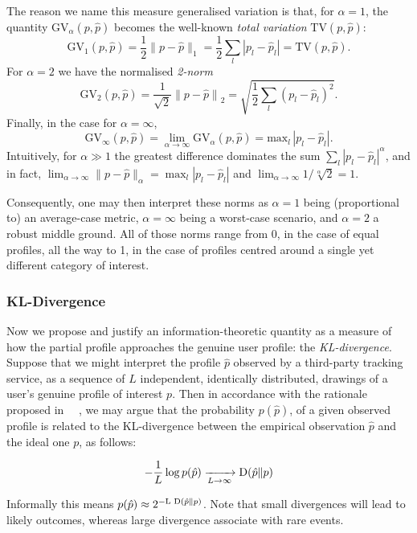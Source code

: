 The reason we name this measure generalised variation is that, for $\alpha = 1$, the quantity $\mathrm{GV}_\alpha(p, \hat{p})$ becomes the well-known \emph{total variation} $\mathrm{TV}(p, \hat{p}) $:
$$ \mathrm{GV}_1(p,\hat{p})= \frac {1} {2}  \| p - \hat{p} \|_1 =  \frac {1} {2} \sum_l | p_{l} - \hat{p}_{l} |=\mathrm{TV}(p, \hat{p}).$$
For $\alpha = 2$ we have the normalised \emph{2-norm}
$$ \mathrm{GV}_2(p,\hat{p}) = \frac {1} {\sqrt{2}}  {\| p - \hat{p} \|}_2 =  \sqrt{{\frac {1} {2}} { \sum_l{ (p_{l} - \hat{p}_{l})^2 } }}.$$
Finally, in the case for $\alpha = \infty$, 
$$\mathrm{GV}_\infty(p,\hat{p})=\lim_{\alpha\to\infty} \mathrm{GV}_\alpha(p, \hat{p}) = \mathrm{max}_l\,|p_l-\hat{p}_l|.$$
Intuitively, for $\alpha \gg 1$ the greatest difference dominates the sum $\sum_l{ {| p_l - \hat{p}_l |}^\alpha }$, and in fact, $\lim_{\alpha\to\infty} \| p - \hat{p} \|_\alpha = \max_l { | p_l - \hat{p}_l | } $ and $\lim_{\alpha\to\infty} 1/\sqrt[\alpha]{2}=1$.

Consequently, one may then interpret these norms as $\alpha = 1$ being (proportional to) an average-case metric, $\alpha=\infty$ being a worst-case scenario, and $\alpha=2$ a robust middle ground. All of those norms range from 0, in the case of equal profiles, all the way to 1, in the case of profiles centred around a single yet different category of interest.

\subsubsection{KL-Divergence}

Now we propose and justify an information-theoretic quantity as a measure of how the partial profile approaches the genuine user profile: the \emph{KL-divergence}. Suppose that we might interpret the profile $\hat{p}$ observed by a third-party tracking service, as a sequence of $L$ independent, identically distributed, drawings of a user's genuine profile of interest $p$. Then in accordance with the rationale proposed in ~\cite{parra2014measuring}~\cite{Rebollo11SecTech}, we may argue that the probability $p(\hat{p})$, of a given observed profile is related to the KL-divergence between the empirical observation $\hat{p}$ and the ideal one $p$, as follows:

$$ - \frac {1}{L} \log{p(\hat{p})} \xrightarrow[L \to \infty]{} \textnormal{D}(\hat{p} \| p) $$

Informally this means $p(\hat{p}) \approx 2^{-\textnormal{L D}(\hat{p} \| p) } $. Note that small divergences will lead to likely outcomes, whereas large divergence associate with rare events.

